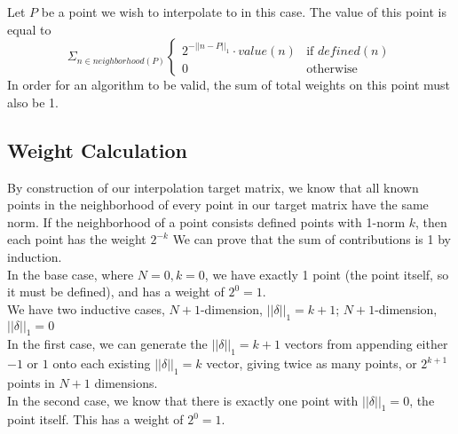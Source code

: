 \documentclass[11pt, oneside]{article}   	%
\begin{document}
Let $P$ be a point we wish to interpolate to in this case. The value of this point is equal to 
$$
\Sigma_{n \in neighborhood(P)}
\begin{cases}
	2^{-||n-P||_1} \cdot value(n)& \text{if } defined(n)\\
	0 & \text{otherwise}
\end{cases}
$$
In order for an algorithm to be valid, the sum of total weights on this point must also be 1.

\subsection{Weight Calculation}
By construction of our interpolation target matrix, we know that all known points in the neighborhood of every point in our target matrix have the same norm. If the neighborhood of a point consists defined points with 1-norm $k$, then each point has the weight $2^{-k}$ We can prove that the sum of contributions is 1 by induction.\\

In the base case, where $N=0, k=0$, we have exactly 1 point (the point itself, so it must be defined), and has a weight of $2^0 = 1$.\\

We have two inductive cases, $N+1$-dimension, $||\delta||_1 = k+1$; $N+1$-dimension, $||\delta||_1 = 0$\\

In the first case, we can generate the $||\delta||_1 = k+1$ vectors from appending either $-1$ or $1$ onto each existing $||\delta||_1 = k$ vector, giving twice as many points, or $2^{k+1}$ points in $N+1$ dimensions.\\

In the second case, we know that there is exactly one point with $||\delta||_1 = 0$, the point itself. This has a weight of $2^0 = 1$.\\
\end{document}

